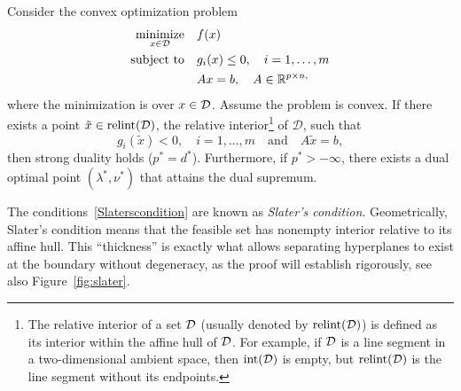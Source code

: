 \begin{theorem}\label{th:slater}
Consider the convex optimization problem
\begin{align} \label{eq:slaterproblem}
\underset{x \in \mathcal{D}}{\operatorname{minimize}} \quad & f(x) \notag \\ \text{subject to} 
    \quad & g_i(x) \leq 0, \quad i = 1, \dots, m \\ & Ax = b, \quad A \in \mathbb{R}^{p \times n,}
\end{align}
where the minimization is over $x \in {\mathcal D}$.
Assume the problem is convex.
If there exists a point $\tilde{x} \in  \operatorname {relint} ({\mathcal D})$, the relative interior\footnote{The relative interior of a set ${\mathcal D}$ (usually denoted by $\operatorname {relint} ({\mathcal D})$) is defined as its interior within the affine hull of ${\mathcal D}$. For example, if ${\mathcal D}$ is a  line segment in a two-dimensional ambient space, then $\operatorname {int} ({\mathcal D})$ is empty, but $\operatorname {relint} ({\mathcal D})$  is the line segment without its endpoints.} of $\mathcal{D}$, such that
\begin{equation}\label{Slaterscondition}
    g_i(\tilde{x}) < 0, \quad i = 1, \dots, m \quad \text{and} \quad A\tilde{x} = b,
\end{equation}
then strong duality holds ($p^* = d^*$). Furthermore, if $p^* > -\infty$, there exists a dual optimal point $(\lambda^*, \nu^*)$ that attains the dual supremum.
\end{theorem}

The conditions~\eqref{Slaterscondition} are known as {\em Slater's condition}. 
Geometrically, Slater's condition means that
the feasible set has nonempty interior relative to its affine hull. This ``thickness'' is exactly what allows separating hyperplanes to exist at the boundary without degeneracy, as the proof will establish rigorously, see also Figure~\ref{fig:slater}.


